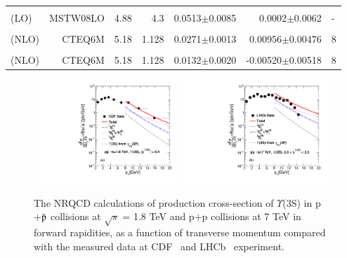 \documentclass[review]{elsarticle}
\begin{document}
\begin{table}
\begin{tabular*}{\textwidth}{@{\extracolsep{\fill}}lrrrrrl@{}}
    & & & & & & \\
    \cite{Sharma:2012dy} (LO) & MSTW08LO & 4.88 & 4.3 & 0.0513$\pm$0.0085 & 0.0002$\pm$0.0062 & -  \\
    & & & & & & \\
    \cite{Gong:2013qka} (NLO) & CTEQ6M & 5.18 & 1.128 & 0.0271$\pm$0.0013 & 0.00956$\pm$0.00476 & 8 \\
    & & & & & & \\
    \cite{Feng:2015wka} (NLO) & CTEQ6M & 5.18 & 1.128 & 0.0132$\pm$0.0020 & -0.00520$\pm$0.00518 & 8 \\
    \hline
    \hline
  \end{tabular*}
  \label{LDMEsY3S}
\end{table}
\normalsize

\begin{figure}
  \centering
  \includegraphics[width=0.49\textwidth]{Figures/NRQCD_Beauty/Fig4a_Y3S_CDF_180GeV_Rap2025.pdf}
  \includegraphics[width=0.49\textwidth]{Figures/NRQCD_Beauty/Fig4b_Y3S_LHCb_7TeV_Rap2025.pdf} 
  \caption{\small{The NRQCD calculations of production cross-section of $\Upsilon$(3S) in
      p +{$\bar {\rm p}$} collisions at $\sqrt{s}$ = 1.8 TeV and p+p collisions at
      7 TeV in forward rapidities, as a function of transverse momentum compared with the measured data 
      at CDF~\cite{Acosta:2001gv} and LHCb~\cite{LHCb:2012aa} experiment. }}
  \label{Fig:SigmaY3SCDF}
\end{figure}
\end{document}
